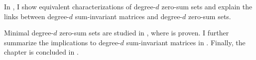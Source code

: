 In , I show equivalent characterizations of degree-$d$ zero-sum sets and explain the links between degree-$d$ sum-invariant matrices and degree-$d$ zero-sum sets. 

Minimal degree-$d$ zero-sum sets are studied in , where  is proven. I further summarize the implications to degree-$d$ sum-invariant matrices in . Finally, the chapter is concluded in .

